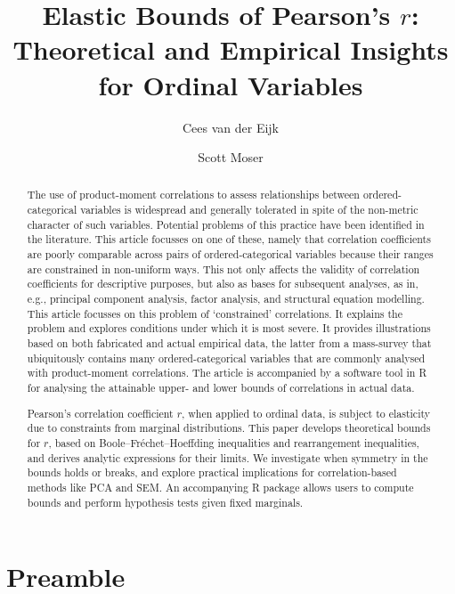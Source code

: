 \documentclass[
  12pt,
]{article}
\title{Elastic Bounds of Pearson's \(r\): Theoretical and Empirical
Insights for Ordinal Variables}
\author{Cees van der Eijk \and Scott Moser}
\date{}
\renewcommand*\contentsname{Table of contents}
\newcommand\contentsname{Table of contents}
\begin{document}
\maketitle

\renewcommand*\contentsname{Table of contents}
{
\hypersetup{linkcolor=}
\setcounter{tocdepth}{3}
\tableofcontents
}

\newpage

\begin{abstract}
The use of product-moment correlations to assess relationships between ordered-categorical variables is widespread and generally tolerated in spite of the non-metric character of such variables. Potential problems of this practice have been identified in the literature. This article focusses on one of these, namely that correlation coefficients are poorly comparable across pairs of ordered-categorical variables because their ranges are constrained in non-uniform ways. This not only affects the validity of correlation coefficients for descriptive purposes, but also as bases for subsequent analyses, as in, e.g., principal component analysis, factor analysis, and structural equation modelling. This article focusses on this problem of ‘constrained’ correlations. It explains the problem and explores conditions under which it is most severe. It provides illustrations based on both fabricated and actual empirical data, the latter from a mass-survey that ubiquitously contains many ordered-categorical variables that are commonly analysed with product-moment correlations. The article is accompanied by a software tool in R for analysing the attainable upper- and lower bounds of correlations in actual data. 

Pearson’s correlation coefficient $r$, when applied to ordinal data, is subject to elasticity due to constraints from marginal distributions. This paper develops theoretical bounds for $r$, based on Boole–Fréchet–Hoeffding inequalities and rearrangement inequalities, and derives analytic expressions for their limits. We investigate when symmetry in the bounds holds or breaks, and explore practical implications for correlation-based methods like PCA and SEM. An accompanying R package allows users to compute bounds and perform hypothesis tests given fixed marginals.
\end{abstract}

\newpage

\section{Preamble}\label{preamble}
\end{document}
